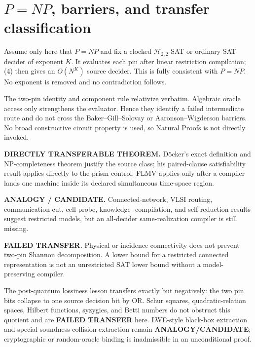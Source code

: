 \documentclass[11pt]{article}
\newcommand{\Htwo}{\mathcal H_{2,2}}
\begin{document}
\section{$P=NP$, barriers, and transfer classification}

Assume only here that $P=NP$ and fix a clocked $\Htwo$-SAT or ordinary SAT
decider of exponent $K$.  It evaluates each pin after linear restriction
compilation; (4) then gives an $O(N^K)$ source decider.  This is fully
consistent with $P=NP$.  No exponent is removed and no contradiction follows.

The two-pin identity and component rule relativize verbatim.  Algebraic
oracle access only strengthens the evaluator.  Hence they identify a failed
intermediate route and do not cross the Baker--Gill--Solovay or
Aaronson--Wigderson barriers.  No broad constructive circuit property is
used, so Natural Proofs is not directly invoked.

\begin{description}[leftmargin=0cm,labelwidth=0cm]
\item[] \textbf{DIRECTLY TRANSFERABLE THEOREM.}
D\"ocker's exact definition and NP-completeness theorem justify the source
class; his paired-clause satisfiability result applies directly to the prism
control.  FLMV applies only after a compiler lands one machine inside its
declared simultaneous time-space region.
\item[] \textbf{ANALOGY / CANDIDATE.}
Connected-network, VLSI routing, communication-cut, cell-probe, knowledge-
compilation, and self-reduction results suggest restricted models, but an
all-decider same-realization compiler is still missing.
\item[] \textbf{FAILED TRANSFER.}
Physical or incidence connectivity does not prevent two-pin Shannon
decomposition.  A lower bound for a restricted connected representation is
not an unrestricted SAT lower bound without a model-preserving compiler.
\end{description}

The post-quantum lossiness lesson transfers exactly but negatively: the two
pin bits collapse to one source decision bit by OR.  Schur squares,
quadratic-relation spaces, Hilbert functions, syzygies, and Betti numbers do
not obstruct this quotient and are \textbf{FAILED TRANSFER} here.  LWE-style
black-box extraction and special-soundness collision extraction remain
\textbf{ANALOGY/CANDIDATE}; cryptographic or random-oracle binding is
inadmissible in an unconditional proof.
\end{document}
